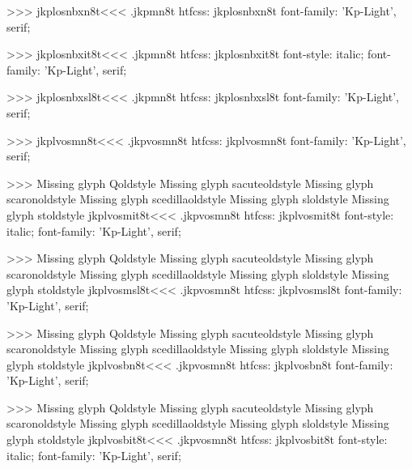 >>>
\<jkplosnbxn8t\><<<
.jkpmn8t
htfcss:  jkplosnbxn8t  font-family: 'Kp-Light', serif;

>>>
\<jkplosnbxit8t\><<<
.jkpmn8t
htfcss:  jkplosnbxit8t  font-style: italic; font-family: 'Kp-Light', serif;

>>>
\<jkplosnbxsl8t\><<<
.jkpmn8t
htfcss:  jkplosnbxsl8t  font-family: 'Kp-Light', serif;

>>>
\<jkplvosmn8t\><<<
.jkpvosmn8t
htfcss:  jkplvosmn8t  font-family: 'Kp-Light', serif;

>>>
Missing glyph	Qoldstyle
Missing glyph	sacuteoldstyle
Missing glyph	scaronoldstyle
Missing glyph	scedillaoldstyle
Missing glyph	sloldstyle
Missing glyph	stoldstyle
\<jkplvosmit8t\><<<
.jkpvosmn8t
htfcss:  jkplvosmit8t  font-style: italic; font-family: 'Kp-Light', serif;

>>>
Missing glyph	Qoldstyle
Missing glyph	sacuteoldstyle
Missing glyph	scaronoldstyle
Missing glyph	scedillaoldstyle
Missing glyph	sloldstyle
Missing glyph	stoldstyle
\<jkplvosmsl8t\><<<
.jkpvosmn8t
htfcss:  jkplvosmsl8t  font-family: 'Kp-Light', serif;

>>>
Missing glyph	Qoldstyle
Missing glyph	sacuteoldstyle
Missing glyph	scaronoldstyle
Missing glyph	scedillaoldstyle
Missing glyph	sloldstyle
Missing glyph	stoldstyle
\<jkplvosbn8t\><<<
.jkpvosmn8t
htfcss:  jkplvosbn8t  font-family: 'Kp-Light', serif;

>>>
Missing glyph	Qoldstyle
Missing glyph	sacuteoldstyle
Missing glyph	scaronoldstyle
Missing glyph	scedillaoldstyle
Missing glyph	sloldstyle
Missing glyph	stoldstyle
\<jkplvosbit8t\><<<
.jkpvosmn8t
htfcss:  jkplvosbit8t  font-style: italic; font-family: 'Kp-Light', serif;

